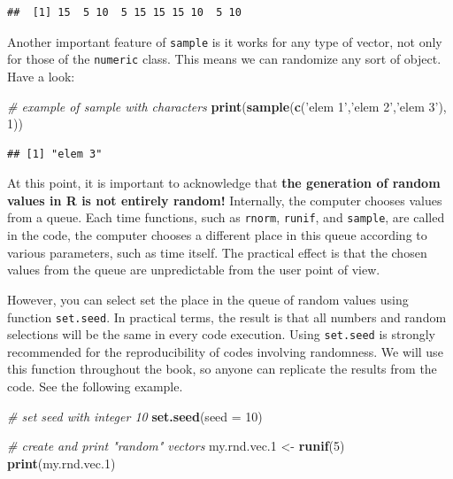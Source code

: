 \documentclass[11pt,]{book}
\newenvironment{Shaded}{\begin{snugshade}}{\end{snugshade}}
\newcommand{\KeywordTok}[1]{\textcolor[rgb]{0.27,0.27,0.27}{\textbf{#1}}}
\newcommand{\DataTypeTok}[1]{\textcolor[rgb]{0.27,0.27,0.27}{#1}}
\newcommand{\DecValTok}[1]{\textcolor[rgb]{0.06,0.06,0.06}{#1}}
\newcommand{\StringTok}[1]{\textcolor[rgb]{0.5,0.5,0.5}{#1}}
\newcommand{\CommentTok}[1]{\textcolor[rgb]{0.56,0.35,0.01}{\textit{#1}}}
\newcommand{\NormalTok}[1]{#1}
\begin{document}
\begin{verbatim}
##  [1] 15  5 10  5 15 15 15 10  5 10
\end{verbatim}

Another important feature of \texttt{sample} is it works for any type of
vector, not only for those of the \texttt{numeric} class. This means we
can randomize any sort of object. Have a look:

\begin{Shaded}
\begin{Highlighting}[]
\CommentTok{# example of sample with characters}
\KeywordTok{print}\NormalTok{(}\KeywordTok{sample}\NormalTok{(}\KeywordTok{c}\NormalTok{(}\StringTok{'elem 1'}\NormalTok{,}\StringTok{'elem 2'}\NormalTok{,}\StringTok{'elem 3'}\NormalTok{), }\DecValTok{1}\NormalTok{))}
\end{Highlighting}
\end{Shaded}

\begin{verbatim}
## [1] "elem 3"
\end{verbatim}

At this point, it is important to acknowledge that \textbf{the
generation of random values in R is not entirely random!} Internally,
the computer chooses values from a queue. Each time functions, such as
\texttt{rnorm}, \texttt{runif}, and \texttt{sample}, are called in the
code, the computer chooses a different place in this queue according to
various parameters, such as time itself. The practical effect is that
the chosen values from the queue are unpredictable from the user point
of view.

However, you can select set the place in the queue of random values
using function \texttt{set.seed}. In practical terms, the result is that
all numbers and random selections will be the same in every code
execution. Using \texttt{set.seed} is strongly recommended for the
reproducibility of codes involving randomness. We will use this function
throughout the book, so anyone can replicate the results from the code.
See the following example. 

\begin{Shaded}
\begin{Highlighting}[]
\CommentTok{# set seed with integer 10}
\KeywordTok{set.seed}\NormalTok{(}\DataTypeTok{seed =} \DecValTok{10}\NormalTok{)}

\CommentTok{# create and print "random" vectors}
\NormalTok{my.rnd.vec.}\DecValTok{1}\NormalTok{ <-}\StringTok{ }\KeywordTok{runif}\NormalTok{(}\DecValTok{5}\NormalTok{)}
\KeywordTok{print}\NormalTok{(my.rnd.vec.}\DecValTok{1}\NormalTok{)}
\end{Highlighting}
\end{Shaded}
\end{document}
